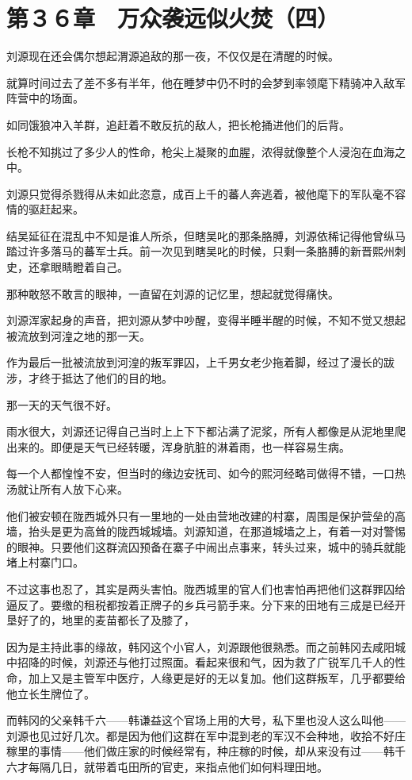 \section{第３６章　万众袭远似火焚（四）}

刘源现在还会偶尔想起渭源追敌的那一夜，不仅仅是在清醒的时候。

就算时间过去了差不多有半年，他在睡梦中仍不时的会梦到率领麾下精骑冲入敌军阵营中的场面。

如同饿狼冲入羊群，追赶着不敢反抗的敌人，把长枪捅进他们的后背。

长枪不知挑过了多少人的性命，枪尖上凝聚的血腥，浓得就像整个人浸泡在血海之中。

刘源只觉得杀戮得从未如此恣意，成百上千的蕃人奔逃着，被他麾下的军队毫不容情的驱赶起来。

结吴延征在混乱中不知是谁人所杀，但瞎吴叱的那条胳膊，刘源依稀记得他曾纵马踏过许多落马的蕃军士兵。前一次见到瞎吴叱的时候，只剩一条胳膊的新晋熙州刺史，还拿眼睛瞪着自己。

那种敢怒不敢言的眼神，一直留在刘源的记忆里，想起就觉得痛快。

刘源浑家起身的声音，把刘源从梦中吵醒，变得半睡半醒的时候，不知不觉又想起被流放到河湟之地的那一天。

作为最后一批被流放到河湟的叛军罪囚，上千男女老少拖着脚，经过了漫长的跋涉，才终于抵达了他们的目的地。

那一天的天气很不好。

雨水很大，刘源还记得自己当时上上下下都沾满了泥浆，所有人都像是从泥地里爬出来的。即便是天气已经转暖，浑身肮脏的淋着雨，也一样容易生病。

每一个人都惶惶不安，但当时的缘边安抚司、如今的熙河经略司做得不错，一口热汤就让所有人放下心来。

他们被安顿在陇西城外只有一里地的一处由营地改建的村寨，周围是保护营垒的高墙，抬头是更为高耸的陇西城城墙。刘源知道，在那道城墙之上，有着一对对警惕的眼神。只要他们这群流囚预备在寨子中闹出点事来，转头过来，城中的骑兵就能堵上村寨门口。

不过这事也忍了，其实是两头害怕。陇西城里的官人们也害怕再把他们这群罪囚给逼反了。要缴的租税都按着正牌子的乡兵弓箭手来。分下来的田地有三成是已经开垦好了的，地里的麦苗都长了及膝了，

因为是主持此事的缘故，韩冈这个小官人，刘源跟他很熟悉。而之前韩冈去咸阳城中招降的时候，刘源还与他打过照面。看起来很和气，因为救了广锐军几千人的性命，加上又是主管军中医疗，人缘更是好的无以复加。他们这群叛军，几乎都要给他立长生牌位了。

而韩冈的父亲韩千六——韩谦益这个官场上用的大号，私下里也没人这么叫他——刘源也见过好几次。都是因为他们这群在军中混到老的军汉不会种地，收拾不好庄稼里的事情——他们做庄家的时候经常有，种庄稼的时候，却从来没有过——韩千六才每隔几日，就带着屯田所的官吏，来指点他们如何料理田地。

